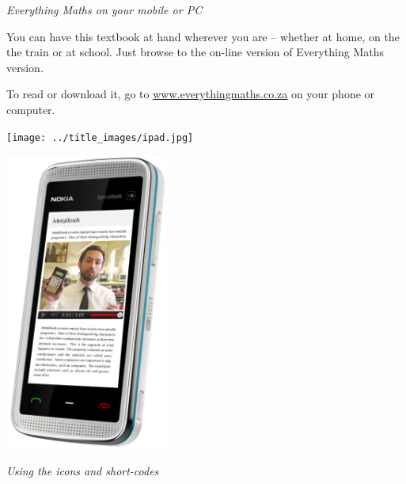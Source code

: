 \newpage
\thispagestyle{empty}

{\normalfont\sffamily\fontsize{22}\normalfont\itshape Everything Maths on your mobile or PC} \par

{\Large
You can have this textbook at hand wherever you are – whether at home, on the the train or at school.
Just browse to the on-line version of Everything Maths version.\par


To read or download it, go to \underline{www.everythingmaths.co.za} on your phone or computer.} \vspace*{2cm}


\begin{center}
\begin{minipage}{0.4\textwidth}
\centering
\texttt{[image: ../title\_images/ipad.jpg]}
\end{minipage}
\begin{minipage}{0.4\textwidth}
\centering
\includegraphics[width=0.4\textwidth]{../title_images/phone.png}
\end{minipage}
\end{center}

\vspace*{2cm}


{\normalfont\sffamily\fontsize{22}\normalfont\itshape Using the icons and short-codes} \par

